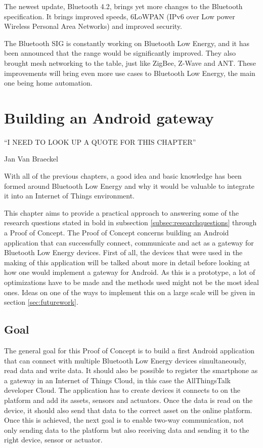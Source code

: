 \documentclass[pdftex,a4paper,12pt,twoside]{report}
\begin{document}
The newest update, Bluetooth 4.2, brings yet more changes to the Bluetooth specification. It brings improved speeds, 6LoWPAN (IPv6 over Low power Wireless Personal Area Networks) and improved security.

The Bluetooth SIG is constantly working on Bluetooth Low Energy, and it has been announced that the range would be significantly improved. They also brought mesh networking to the table, just like ZigBee, Z-Wave and ANT. These improvements will bring even more use cases to Bluetooth Low Energy, the main one being home automation.

\chapter{Building an Android gateway}
\label{ch:android}
\epigraph{``I NEED TO LOOK UP A QUOTE FOR THIS CHAPTER''}{Jan Van Braeckel}
With all of the previous chapters, a good idea and basic knowledge has been formed around Bluetooth Low Energy and why it would be valuable to integrate it into an Internet of Things environment.

This chapter aims to provide a practical approach to answering some of the research questions stated in bold in subsection \ref{subsec:researchquestions} through a Proof of Concept. The Proof of Concept concerns building an Android application that can successfully connect, communicate and act as a gateway for Bluetooth Low Energy devices. First of all, the devices that were used in the making of this application will be talked about more in detail before looking at how one would implement a gateway for Android. As this is a prototype, a lot of optimizations have to be made and the methods used might not be the most ideal ones. Ideas on one of the ways to implement this on a large scale will be given in section \ref{sec:futurework}.

\newpage{}

\section{Goal}
\label{sec:pocgoal}
The general goal for this Proof of Concept is to build a first Android application that can connect with multiple Bluetooth Low Energy devices simultaneously, read data and write data. It should also be possible to register the smartphone as a gateway in an Internet of Things Cloud, in this case the AllThingsTalk developer Cloud. The application has to create devices it connects to on the platform and add its assets, sensors and actuators. Once the data is read on the device, it should also send that data to the correct asset on the online platform. Once this is achieved, the next goal is to enable two-way communication, not only sending data to the platform but also receiving data and sending it to the right device, sensor or actuator.
\end{document}
